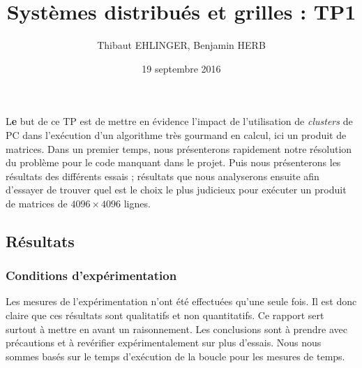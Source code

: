 \documentclass[	DIV=calc,%
							paper=a4,%
							fontsize=11pt,%
							twocolumn]{scrartcl}	 					%
\title{Systèmes distribués et grilles : TP1}					%
\author{Thibaut EHLINGER, Benjamin HERB }											%
\date{19 septembre 2016}
\newcommand{\initial}[1]{%
     \lettrine[lines=3,lhang=0.3,nindent=0em]{
     				\color{DarkGoldenrod}
     				{\textsf{#1}}}{}}
\begin{document}
\maketitle
\thispagestyle{fancy} 			%
\initial{L}\textbf{e} but de ce TP est de mettre en évidence l'impact de l'utilisation de \textit{clusters} de PC dans l'exécution d'un algorithme très gourmand en calcul, ici un produit de matrices. Dans un premier temps, nous présenterons rapidement notre résolution du problème pour le code manquant dans le projet. Puis nous présenterons les résultats des différents essais ; résultats que nous analyserons ensuite afin d'essayer de trouver quel est le choix le plus judicieux pour exécuter un produit de matrices de $ 4096 \times 4096 $ lignes.




\subsection*{Résultats}

\subsubsection*{Conditions d'expérimentation}
Les mesures de l'expérimentation n'ont été effectuées qu'une seule fois. Il est donc claire que ces résultats sont qualitatifs et non quantitatifs. Ce rapport sert surtout à mettre en avant un raisonnement. Les conclusions sont à prendre avec précautions et à revérifier expérimentalement sur plus d'essais. \newline
Nous nous sommes basés sur le temps d'exécution de la boucle pour les mesures de temps.
\end{document}
